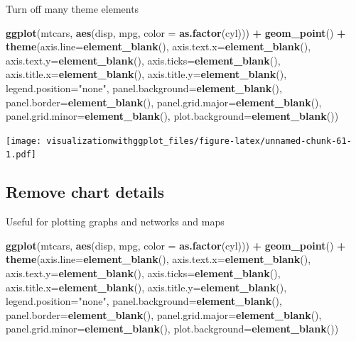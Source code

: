 \documentclass[]{krantz}
\makeatletter
\newenvironment{Shaded}{\begin{snugshade}}{\end{snugshade}}
\newcommand{\KeywordTok}[1]{\textcolor[rgb]{0.13,0.29,0.53}{\textbf{#1}}}
\newcommand{\DataTypeTok}[1]{\textcolor[rgb]{0.13,0.29,0.53}{#1}}
\newcommand{\StringTok}[1]{\textcolor[rgb]{0.31,0.60,0.02}{#1}}
\newcommand{\OperatorTok}[1]{\textcolor[rgb]{0.81,0.36,0.00}{\textbf{#1}}}
\newcommand{\NormalTok}[1]{#1}
\newenvironment{kframe}{%
\medskip{}
\setlength{\fboxsep}{.8em}
 \def\at@end@of@kframe{}%
 \ifinner\ifhmode%
  \def\at@end@of@kframe{\end{minipage}}%
  \begin{minipage}{\columnwidth}%
 \fi\fi%
 \def\FrameCommand##1{\hskip\@totalleftmargin \hskip-\fboxsep
 \colorbox{shadecolor}{##1}\hskip-\fboxsep
     \hskip-\linewidth \hskip-\@totalleftmargin \hskip\columnwidth}%
 \MakeFramed {\advance\hsize-\width
   \@totalleftmargin\z@ \linewidth\hsize
   \@setminipage}}%
 {\par\unskip\endMakeFramed%
 \at@end@of@kframe}
\renewenvironment{Shaded}{\begin{kframe}}{\end{kframe}}
\theoremstyle{definition}
\theoremstyle{definition}
\theoremstyle{definition}
\theoremstyle{remark}
\makeatother
\begin{document}
Turn off many theme elements

\begin{Shaded}
\begin{Highlighting}[]
\KeywordTok{ggplot}\NormalTok{(mtcars, }\KeywordTok{aes}\NormalTok{(disp, mpg, }\DataTypeTok{color =} \KeywordTok{as.factor}\NormalTok{(cyl))) }\OperatorTok{+}\StringTok{ }
\KeywordTok{geom_point}\NormalTok{() }\OperatorTok{+}
\StringTok{    }\KeywordTok{theme}\NormalTok{(}\DataTypeTok{axis.line=}\KeywordTok{element_blank}\NormalTok{(), }\DataTypeTok{axis.text.x=}\KeywordTok{element_blank}\NormalTok{(),   }\DataTypeTok{axis.text.y=}\KeywordTok{element_blank}\NormalTok{(), }\DataTypeTok{axis.ticks=}\KeywordTok{element_blank}\NormalTok{(),    }\DataTypeTok{axis.title.x=}\KeywordTok{element_blank}\NormalTok{(), }\DataTypeTok{axis.title.y=}\KeywordTok{element_blank}\NormalTok{(),     }\DataTypeTok{legend.position=}\StringTok{"none"}\NormalTok{, }\DataTypeTok{panel.background=}\KeywordTok{element_blank}\NormalTok{(),   }\DataTypeTok{panel.border=}\KeywordTok{element_blank}\NormalTok{(), }\DataTypeTok{panel.grid.major=}\KeywordTok{element_blank}\NormalTok{(),     }\DataTypeTok{panel.grid.minor=}\KeywordTok{element_blank}\NormalTok{(), }\DataTypeTok{plot.background=}\KeywordTok{element_blank}\NormalTok{())}
\end{Highlighting}
\end{Shaded}

\texttt{[image: visualizationwithggplot\_files/figure-latex/unnamed-chunk-61-1.pdf]}

\subsection{Remove chart details}\label{remove-chart-details}

Useful for plotting graphs and networks and maps

\begin{Shaded}
\begin{Highlighting}[]
\KeywordTok{ggplot}\NormalTok{(mtcars, }\KeywordTok{aes}\NormalTok{(disp,  mpg, }\DataTypeTok{color =} \KeywordTok{as.factor}\NormalTok{(cyl))) }\OperatorTok{+}\StringTok{ }\KeywordTok{geom_point}\NormalTok{() }\OperatorTok{+}
\StringTok{  }\KeywordTok{theme}\NormalTok{(}\DataTypeTok{axis.line=}\KeywordTok{element_blank}\NormalTok{(),}
      \DataTypeTok{axis.text.x=}\KeywordTok{element_blank}\NormalTok{(),}
      \DataTypeTok{axis.text.y=}\KeywordTok{element_blank}\NormalTok{(),}
      \DataTypeTok{axis.ticks=}\KeywordTok{element_blank}\NormalTok{(),}
      \DataTypeTok{axis.title.x=}\KeywordTok{element_blank}\NormalTok{(),}
      \DataTypeTok{axis.title.y=}\KeywordTok{element_blank}\NormalTok{(),}
      \DataTypeTok{legend.position=}\StringTok{"none"}\NormalTok{,}
      \DataTypeTok{panel.background=}\KeywordTok{element_blank}\NormalTok{(),}
      \DataTypeTok{panel.border=}\KeywordTok{element_blank}\NormalTok{(),}
      \DataTypeTok{panel.grid.major=}\KeywordTok{element_blank}\NormalTok{(),}
      \DataTypeTok{panel.grid.minor=}\KeywordTok{element_blank}\NormalTok{(),}
      \DataTypeTok{plot.background=}\KeywordTok{element_blank}\NormalTok{())}
\end{Highlighting}
\end{Shaded}
\end{document}
